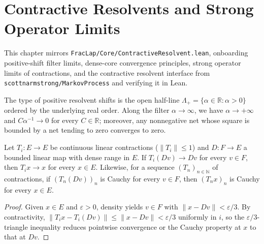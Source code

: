 \chapter{Contractive Resolvents and Strong Operator Limits}

This chapter mirrors \texttt{FracLap/Core/ContractiveResolvent.lean}, onboarding positive-shift filter limits, dense-core convergence principles, strong operator limits of contractions, and the contractive resolvent interface from \texttt{scottnarmstrong/MarkovProcess} and verifying it in Lean.

\begin{definition}\label{def:positive_shift}
\leanok
The type of positive resolvent shifts is the open half-line $\Lambda_+ = \{\alpha \in \mathbb{R} : \alpha > 0\}$ ordered by the underlying real order. Along the filter $\alpha \to \infty$, we have $\alpha \to +\infty$ and $C \alpha^{-1} \to 0$ for every $C \in \mathbb{R}$; moreover, any nonnegative net whose square is bounded by a net tending to zero converges to zero.
\end{definition}

\begin{lemma}\label{lem:dense_core_convergence}
\leanok
Let $T_i : E \to E$ be continuous linear contractions ($\lVert T_i \rVert \le 1$) and $D : F \to E$ a bounded linear map with dense range in $E$. If $T_i(Dv) \to Dv$ for every $v \in F$, then $T_i x \to x$ for every $x \in E$. Likewise, for a sequence $(T_n)_{n \in \mathbb{N}}$ of contractions, if $(T_n(Dv))_n$ is Cauchy for every $v \in F$, then $(T_n x)_n$ is Cauchy for every $x \in E$.
\end{lemma}

\begin{proof}
\leanok
Given $x \in E$ and $\varepsilon > 0$, density yields $v \in F$ with $\lVert x - Dv \rVert < \varepsilon / 3$. By contractivity, $\lVert T_i x - T_i(Dv) \rVert \le \lVert x - Dv \rVert < \varepsilon / 3$ uniformly in $i$, so the $\varepsilon/3$-triangle inequality reduces pointwise convergence or the Cauchy property at $x$ to that at $Dv$.
\end{proof}

